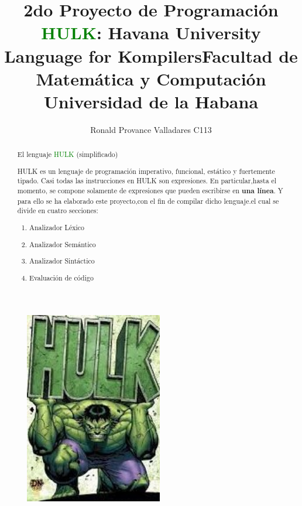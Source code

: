 \documentclass[a4paper,12pt]{article}
\title{2do Proyecto de Programación \\ {\textcolor{green}{HULK}}: Havana University Language for Kompilers}
\author{Ronald Provance Valladares C113}
\date{}
\begin{document}
	\maketitle
	\begin{figure}[h]
		\centering
		\includegraphics[width=6cm]{icono.jpg}
	\end{figure}
	
	\begin{center}
		\Large\title{Facultad de Matemática y Computación }\\ 
	\Large\title{Universidad de la Habana}
	\end{center}
	
	
	\begin{abstract}
		
		\begin{center}
			\large El lenguaje {\textcolor{green}{HULK}} (simplificado)
		\end{center}
		
		\normalsize{HULK es un lenguaje de programación imperativo, funcional, estático y fuertemente tipado. Casi todas las instrucciones en HULK son expresiones. En particular,hasta el momento, se compone solamente de expresiones que pueden escribirse en \textbf{una línea}. Y para ello se ha elaborado este proyecto,con el fin de compilar dicho lenguaje.el cual se divide en cuatro secciones:}
		
		\begin{enumerate}
			\item Analizador Léxico      \item Analizador Semántico
			\item Analizador Sintáctico  \item Evaluación de código
		\end{enumerate}
		
	\end{abstract}
	
\end{document}
